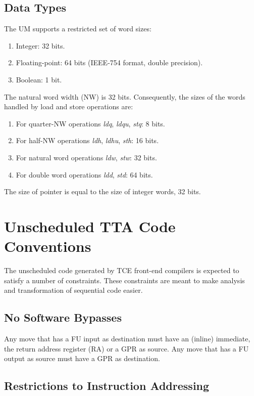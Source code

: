 \documentclass[twoside]{tce}
\begin{document}
\subsection{Data Types}
\label{ssec:data-types}

The UM supports a restricted set of word sizes:
\begin{enumerate}
\item Integer: 32 bits.
\item Floating-point: 64 bits (IEEE-754 format, double precision).
\item Boolean: 1 bit.
\end{enumerate}

The natural word width (NW) is 32 bits.  Consequently, the sizes of the
words handled by load and store operations are:
\begin{enumerate}
\item For quarter-NW operations \emph{ldq}, \emph{ldqu}, \emph{stq}: 8 bits.
\item For half-NW operations \emph{ldh}, \emph{ldhu}, \emph{sth}: 16 bits.
\item For natural word operations \emph{ldw}, \emph{stw}: 32 bits.
\item For double word operations \emph{ldd}, \emph{std}: 64 bits.
\end{enumerate}

The size of pointer is equal to the size of integer words, 32 bits.

\section{Unscheduled TTA Code Conventions}
\label{sec:um-conventions}

The unscheduled code generated by TCE front-end compilers is expected to
satisfy a number of constraints.  These constraints are meant to make
analysis and transformation of sequential code easier.

\subsection{No Software Bypasses}

Any move that has a FU input as destination must have an (inline) immediate,
the return address register (RA) or a GPR as source. Any move that has a FU
output as source must have a GPR as destination.

\subsection{Restrictions to Instruction Addressing}
\end{document}
